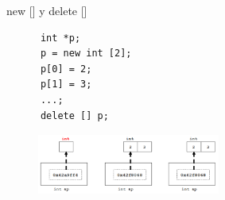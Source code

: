 \documentclass[xcolor=table,spanish,9pt]{beamer}
\begin{document}
\begin{frame}[fragile]
  \begin{block}{new [] y delete []}
    \begin{lstlisting}
      int *p;
      p = new int [2];
      p[0] = 2;
      p[1] = 3;
      ...;
      delete [] p;
    \end{lstlisting}
    \begin{figure}
      \centering
      \includegraphics[width=6cm,height=2cm,keepaspectratio=true,clip=true]
      {./figures/new_array.png}\\
    \end{figure}
\end{block}
\end{frame}
\end{document}
